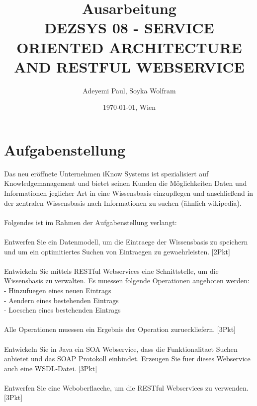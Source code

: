 \documentclass[11pt]{article}
\title{Ausarbeitung\\DEZSYS 08 -
SERVICE ORIENTED ARCHITECTURE AND RESTFUL WEBSERVICE}
\author{Adeyemi Paul, Soyka Wolfram}
\date{\today{}, Wien}
\begin{document}
\maketitle
\newpage
\tableofcontents
\newpage

\lstset{basicstyle=\ttfamily\small,
        keywordstyle=,
        commentstyle=\itshape,
        numbers=left,                   %
        stepnumber=1,
        breaklines=true,					%
        numberstyle=\tiny,
        showstringspaces=false,
        abovecaptionskip=0pt,
        belowcaptionskip=0pt,
        xleftmargin=\parindent,
        fontadjust}
        
\section{Aufgabenstellung}
Das neu eröffnete Unternehmen iKnow Systems ist spezialisiert auf Knowledgemanagement und bietet seinen Kunden die Möglichkeiten Daten und Informationen jeglicher Art in eine Wissensbasis einzupflegen und anschließend in der zentralen Wissensbasis nach Informationen zu suchen (ähnlich wikipedia).\\
\\
Folgendes ist im Rahmen der Aufgabenstellung verlangt:\\
\\
Entwerfen Sie ein Datenmodell, um die Eintraege der Wissensbasis zu speichern und um ein optimitiertes Suchen von Eintraegen zu gewaehrleisten. [2Pkt]\\
\\
Entwickeln Sie mittels RESTful Webservices eine Schnittstelle, um die Wissensbasis zu verwalten. Es muessen folgende Operationen angeboten werden:\\
- Hinzufuegen eines neuen Eintrags\\
- Aendern eines bestehenden Eintrags\\
- Loeschen eines bestehenden Eintrags\\
\\
Alle Operationen muessen ein Ergebnis der Operation zurueckliefern. [3Pkt]\\
\\
Entwickeln Sie in Java ein SOA Webservice, dass die Funktionalitaet Suchen anbietet und das SOAP Protokoll einbindet. Erzeugen Sie fuer dieses Webservice auch eine WSDL-Datei. [3Pkt]\\
\\
Entwerfen Sie eine Weboberflaeche, um die RESTful Webservices zu verwenden. [3Pkt]\\
\end{document}
